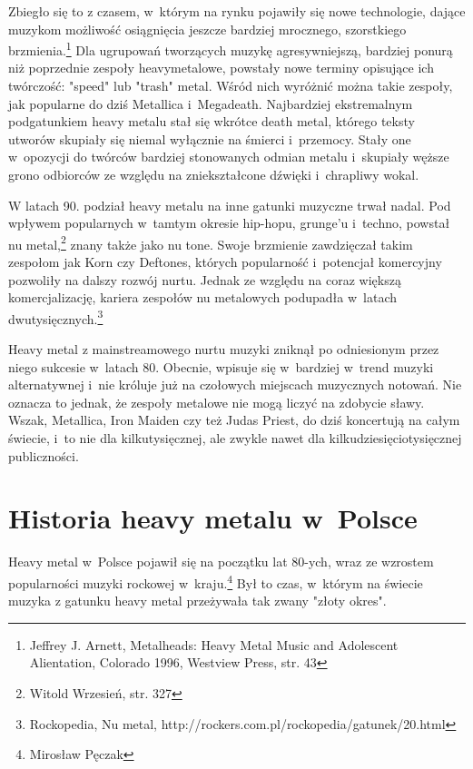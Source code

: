 \documentclass[12pt, a4paper, titlepage]{report}
\begin{document}
Zbiegło się to z czasem, w~którym na rynku pojawiły się nowe technologie, dające muzykom możliwość osiągnięcia jeszcze bardziej mrocznego, szorstkiego brzmienia.\footnote{Jeffrey J. Arnett, Metalheads: Heavy Metal Music and Adolescent Alientation, Colorado 1996, Westview Press, str. 43} Dla ugrupowań tworzących muzykę agresywniejszą, bardziej ponurą niż poprzednie zespoły heavymetalowe, powstały nowe terminy opisujące ich twórczość: "speed" lub "trash" metal. Wśród nich wyróżnić można takie zespoły, jak popularne do dziś Metallica i~Megadeath. Najbardziej ekstremalnym podgatunkiem heavy metalu stał się wkrótce death metal, którego teksty utworów skupiały się niemal wyłącznie na śmierci i~przemocy. Stały one w~opozycji do twórców bardziej stonowanych odmian metalu i~skupiały węższe grono odbiorców ze względu na zniekształcone dźwięki i~chrapliwy wokal.

W latach 90. podział heavy metalu na inne gatunki muzyczne trwał nadal. Pod wpływem popularnych w~tamtym okresie hip-hopu, grunge'u i~techno, powstał nu metal,\footnote{Witold Wrzesień, str. 327} znany także jako nu tone. Swoje brzmienie zawdzięczał takim zespołom jak Korn czy Deftones, których popularność i~potencjał komercyjny pozwoliły na dalszy rozwój nurtu. Jednak ze względu na coraz większą komercjalizację, kariera zespołów nu metalowych podupadła w~latach dwutysięcznych.\footnote{Rockopedia, Nu metal, http://rockers.com.pl/rockopedia/gatunek/20.html} 

Heavy metal z mainstreamowego nurtu muzyki zniknął po odniesionym przez niego sukcesie w~latach 80. Obecnie, wpisuje się w~bardziej w~trend muzyki alternatywnej i~nie króluje już na czołowych miejscach muzycznych notowań. Nie oznacza to jednak, że zespoły metalowe nie mogą liczyć na zdobycie sławy. Wszak, Metallica, Iron Maiden czy też Judas Priest, do dziś koncertują na całym świecie, i~to nie dla kilkutysięcznej, ale zwykle nawet dla kilkudziesięciotysięcznej publiczności. 

\section{Historia heavy metalu w~Polsce}
Heavy metal w~Polsce pojawił się na początku lat 80-ych, wraz ze wzrostem popularności muzyki rockowej w~kraju.\footnote{Mirosław Pęczak} Był to czas, w~którym na świecie muzyka z gatunku heavy metal przeżywała tak zwany "złoty okres". 
\end{document}
